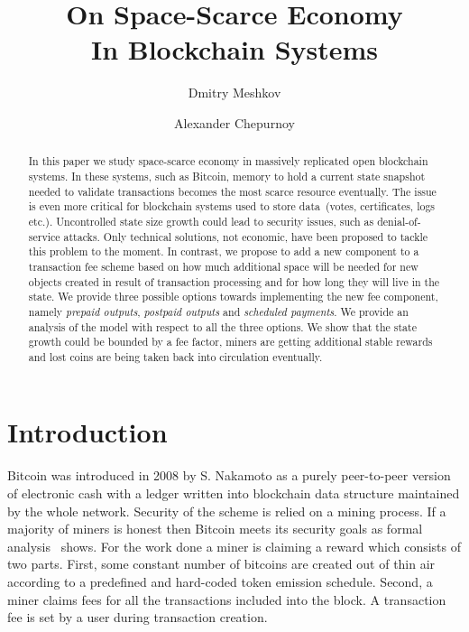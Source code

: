 \documentclass[]{llncs}   %
\begin{document}
\title{On Space-Scarce Economy\\ In Blockchain Systems}
\author{Dmitry Meshkov \and Alexander Chepurnoy}
\maketitle

\begin{abstract}
In this paper we study space-scarce economy in massively replicated open blockchain systems. In these systems, such as Bitcoin, memory to hold a current state snapshot needed to validate transactions becomes the most scarce resource eventually. The issue is even more critical for blockchain systems used to store data~(votes, certificates, logs etc.). Uncontrolled state size growth could lead to security issues, such as denial-of-service attacks. Only technical solutions, not economic, have been proposed to tackle this problem to the moment. In contrast, we propose to add a new component to a transaction fee scheme based on how much additional space will be needed for new objects created in result of transaction processing and for how long they will live in the state. We provide three possible options towards implementing the new fee component, namely \textit{prepaid outputs}, \textit{postpaid outputs} and \textit{scheduled payments}. We provide an analysis of the model with respect to all the three options. We show that the state growth could be bounded by a fee factor, miners are getting additional stable rewards and lost coins are being taken back into circulation eventually.    
\end{abstract}

\section{Introduction}

Bitcoin \cite{Nakamoto2008} was introduced in 2008 by S. Nakamoto as a purely peer-to-peer version of electronic cash with a ledger written into blockchain data structure maintained by the whole network. Security of the scheme is relied on a mining process. If a majority of miners is honest then Bitcoin meets its security goals as formal analysis~\cite{Garay2015} shows. For the work done a miner is claiming a reward which consists of two parts. First, some constant number of bitcoins are created out of thin air according to a predefined and hard-coded token emission schedule. Second, a miner claims fees for all the transactions included into the block. A transaction fee is set by a user during transaction creation.
\end{document}
